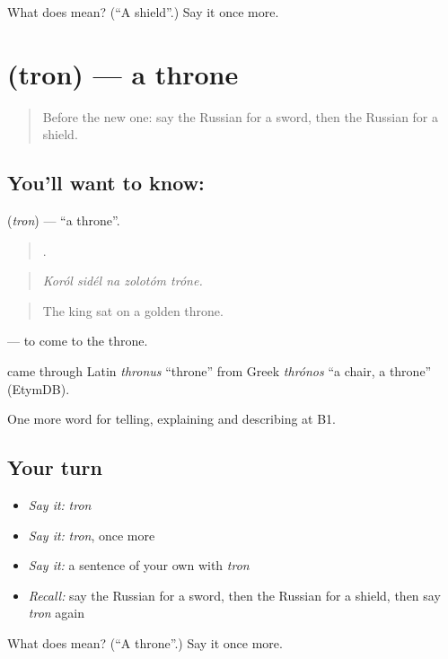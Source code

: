 \begin{tcolorbox}[breakable,colback=teal!4,colframe=teal!35!black,title={Before you move on}]
What does  mean? (\textquotedblleft{}A shield\textquotedblright{}.) Say it once more.
\end{tcolorbox}
\section[\texorpdfstring{\ru{трон} (tron)}{трон (tron)}]{ (tron) — a throne}

\label{lesson:RU-C322-tron}



\begin{quote}
Before the new one: say the Russian for a sword, then the Russian for a shield.
\end{quote}

\subsection*{You'll want to know: }
\textbf{} (\emph{tron}) — \textquotedblleft{}a throne\textquotedblright{}.

\begin{quote}
    .
\end{quote}

\begin{quote}
\emph{Koról sidél na zolotóm tróne.}
\end{quote}

\begin{quote}
The king sat on a golden throne.
\end{quote}

\emph{  } — to come to the throne.

\begin{cousinweb}
\emph{} came through Latin \emph{thronus} \textquotedblleft{}throne\textquotedblright{} from Greek \emph{thrónos} \textquotedblleft{}a chair, a throne\textquotedblright{} (EtymDB).
\end{cousinweb}

\begin{grammarlens}[title={What you've built}]
One more word for telling, explaining and describing at B1.
\end{grammarlens}

\subsection*{Your turn}
\begin{itemize}
\raggedright
  \item \emph{Say it:} \emph{tron}
  \item \emph{Say it:} \emph{tron}, once more
  \item \emph{Say it:} a sentence of your own with \emph{tron}
  \item \emph{Recall:} say the Russian for a sword, then the Russian for a shield, then say \emph{tron} again
\end{itemize}

\begin{tcolorbox}[breakable,colback=teal!4,colframe=teal!35!black,title={Before you move on}]
What does  mean? (\textquotedblleft{}A throne\textquotedblright{}.) Say it once more.
\end{tcolorbox}
